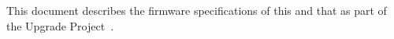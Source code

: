 This document describes the firmware specifications of this and that as part of the  \phaseTwo Upgrade Project~\cite{Collaboration:2285584}.
